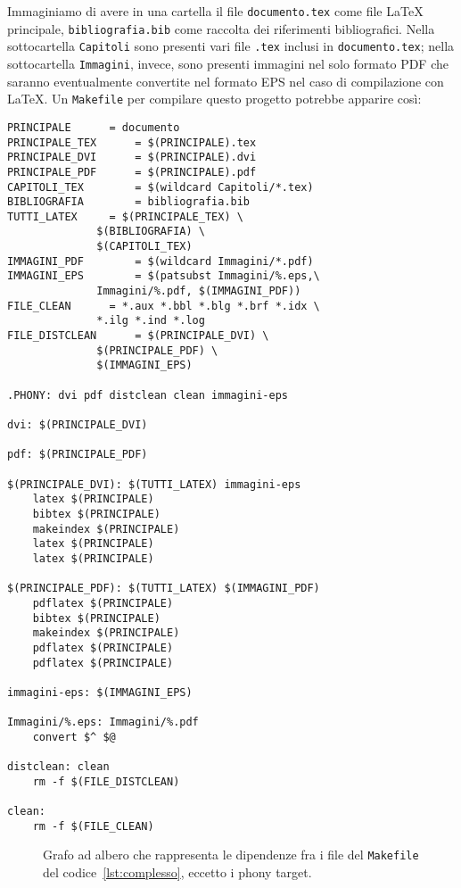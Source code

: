 Immaginiamo di avere in una cartella il file \texttt{documento.tex} come file
\LaTeX{}
principale, \texttt{bibliografia.bib} come raccolta dei riferimenti
bibliografici.  Nella sottocartella \texttt{Capitoli} sono presenti vari file
\texttt{.tex} inclusi in \texttt{documento.tex}; nella sottocartella
\texttt{Immagini}, invece, sono presenti immagini nel solo formato \textsc{PDF}
che saranno eventualmente convertite nel formato \textsc{EPS} nel caso di
compilazione con \LaTeX.  Un \texttt{Makefile} per compilare questo progetto
potrebbe apparire così:
\begin{lstlisting}[caption={Un \texttt{Makefile} complesso.},
label=lst:complesso]
PRINCIPALE 		= documento
PRINCIPALE_TEX		= $(PRINCIPALE).tex
PRINCIPALE_DVI		= $(PRINCIPALE).dvi
PRINCIPALE_PDF		= $(PRINCIPALE).pdf
CAPITOLI_TEX		= $(wildcard Capitoli/*.tex)
BIBLIOGRAFIA		= bibliografia.bib
TUTTI_LATEX		= $(PRINCIPALE_TEX) \
			  $(BIBLIOGRAFIA) \
			  $(CAPITOLI_TEX)
IMMAGINI_PDF		= $(wildcard Immagini/*.pdf)
IMMAGINI_EPS		= $(patsubst Immagini/%.eps,\
			  Immagini/%.pdf, $(IMMAGINI_PDF))
FILE_CLEAN		= *.aux *.bbl *.blg *.brf *.idx \
			  *.ilg *.ind *.log
FILE_DISTCLEAN		= $(PRINCIPALE_DVI) \
			  $(PRINCIPALE_PDF) \
			  $(IMMAGINI_EPS)

.PHONY: dvi pdf distclean clean immagini-eps

dvi: $(PRINCIPALE_DVI)

pdf: $(PRINCIPALE_PDF)

$(PRINCIPALE_DVI): $(TUTTI_LATEX) immagini-eps
	latex $(PRINCIPALE)
	bibtex $(PRINCIPALE)
	makeindex $(PRINCIPALE)
	latex $(PRINCIPALE)
	latex $(PRINCIPALE)

$(PRINCIPALE_PDF): $(TUTTI_LATEX) $(IMMAGINI_PDF)
	pdflatex $(PRINCIPALE)
	bibtex $(PRINCIPALE)
	makeindex $(PRINCIPALE)
	pdflatex $(PRINCIPALE)
	pdflatex $(PRINCIPALE)

immagini-eps: $(IMMAGINI_EPS)

Immagini/%.eps: Immagini/%.pdf
	convert $^ $@

distclean: clean
	rm -f $(FILE_DISTCLEAN)

clean:
	rm -f $(FILE_CLEAN)
\end{lstlisting}
\begin{figure}
  \centering
  \caption{Grafo ad albero che rappresenta le dipendenze fra i file del
    \texttt{Makefile} del codice~\ref{lst:complesso}, eccetto i phony target.}
  \label{fig:grafo-albero2}
\end{figure}
